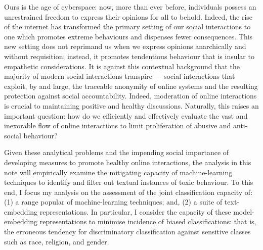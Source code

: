 
Ours is the age of cyberspace: now, more than ever before, individuals possess an unrestrained freedom to express their opinions for all to behold. 
Indeed, the rise of the internet has transformed the primary setting of our social interactions to one which promotes extreme behaviours and dispenses fewer consequences.
This new setting does not reprimand us when we express opinions anarchically and without requisition; instead, it promotes tendentious behaviour that is insular to empathetic considerations.
It is against this contextual background that the majority of modern social interactions transpire --- social interactions that exploit, by and large, the traceable anonymity of online systems and the resulting protection against social accountability. 
Indeed, moderation of online interactions is crucial to maintaining positive and healthy discussions. 
Naturally, this raises an important question: how do we efficiently and effectively evaluate the vast and inexorable flow of online interactions to limit proliferation of abusive and anti-social behaviour?

Given these analytical problems and the impending social importance of developing measures to promote healthy online interactions, the analysis in this note will empirically examine the mitigating capacity of machine-learning techniques to identify and filter out textual instances of toxic behaviour.
To this end, I focus my analysis on the assessment of the joint classification capacity of: (1) a range popular of machine-learning techniques; and, (2) a suite of text-embedding representations. 
In particular, I consider the capacity of these model-embedding representations to minimise incidence of biased classifications: that is, the erroneous tendency for discriminatory classification against sensitive classes such as race, religion, and gender.




